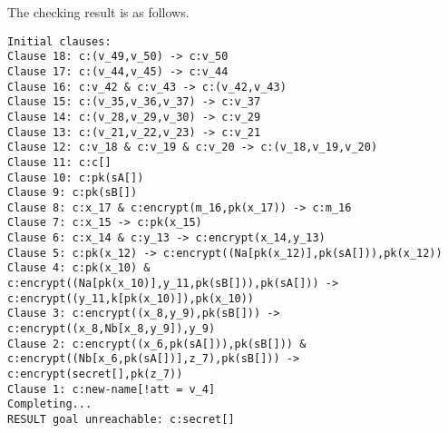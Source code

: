 \documentclass[a4paper, 12pt]{report}
\begin{document}
        The checking result is as follows.
        \begin{lstlisting}[frame=single]
Initial clauses:
Clause 18: c:(v_49,v_50) -> c:v_50
Clause 17: c:(v_44,v_45) -> c:v_44
Clause 16: c:v_42 & c:v_43 -> c:(v_42,v_43)
Clause 15: c:(v_35,v_36,v_37) -> c:v_37
Clause 14: c:(v_28,v_29,v_30) -> c:v_29
Clause 13: c:(v_21,v_22,v_23) -> c:v_21
Clause 12: c:v_18 & c:v_19 & c:v_20 -> c:(v_18,v_19,v_20)
Clause 11: c:c[]
Clause 10: c:pk(sA[])
Clause 9: c:pk(sB[])
Clause 8: c:x_17 & c:encrypt(m_16,pk(x_17)) -> c:m_16
Clause 7: c:x_15 -> c:pk(x_15)
Clause 6: c:x_14 & c:y_13 -> c:encrypt(x_14,y_13)
Clause 5: c:pk(x_12) -> c:encrypt((Na[pk(x_12)],pk(sA[])),pk(x_12))
Clause 4: c:pk(x_10) & c:encrypt((Na[pk(x_10)],y_11,pk(sB[])),pk(sA[])) -> c:encrypt((y_11,k[pk(x_10)]),pk(x_10))
Clause 3: c:encrypt((x_8,y_9),pk(sB[])) -> c:encrypt((x_8,Nb[x_8,y_9]),y_9)
Clause 2: c:encrypt((x_6,pk(sA[])),pk(sB[])) & c:encrypt((Nb[x_6,pk(sA[])],z_7),pk(sB[])) -> c:encrypt(secret[],pk(z_7))
Clause 1: c:new-name[!att = v_4]
Completing...
RESULT goal unreachable: c:secret[]
        \end{lstlisting}
\end{document}
